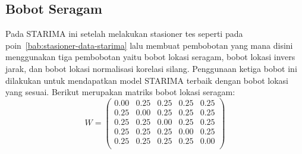 \subsection{Bobot Seragam}
Pada STARIMA ini setelah melakukan stasioner tes seperti pada poin~\ref{bab:stasioner-data-starima} lalu membuat pembobotan yang mana disini menggunakan tiga pembobotan yaitu bobot lokasi seragam, bobot lokasi invers jarak, dan bobot lokasi normalisasi korelasi silang.
Penggunaan ketiga bobot ini dilakukan untuk mendapatkan model STARIMA terbaik dengan bobot lokasi yang sesuai. 
Berikut merupakan matriks bobot lokasi seragam:
\begin{equation}
    \label{swm-bobot-seragam}
    W = 
    \begin{pmatrix}
        0.00 & 0.25 & 0.25 & 0.25 & 0.25 \\
        0.25 & 0.00 & 0.25 & 0.25 & 0.25 \\
        0.25 & 0.25 & 0.00 & 0.25 & 0.25 \\
        0.25 & 0.25 & 0.25 & 0.00 & 0.25 \\
        0.25 & 0.25 & 0.25 & 0.25 & 0.00 \\
    \end{pmatrix}
\end{equation}
